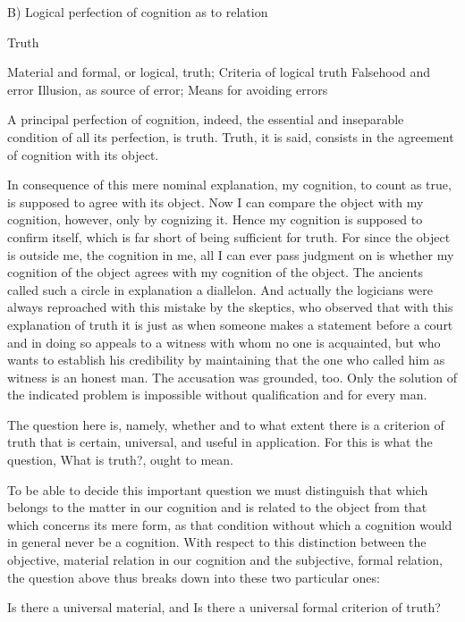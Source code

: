 B) Logical perfection of cognition as to relation

Truth

    Material and formal, or logical, truth;
    Criteria of logical truth
    Falsehood and error
    Illusion, as source of error;
    Means for avoiding errors

A principal perfection of cognition, indeed,
the essential and inseparable condition of all its perfection, is truth.
Truth, it is said, consists in the agreement of cognition with its object.

In consequence of this mere nominal explanation, my cognition,
to count as true, is supposed to agree with its object.
Now I can compare the object with my cognition, however,
only by cognizing it.
Hence my cognition is supposed to confirm itself,
which is far short of being sufficient for truth.
For since the object is outside me, the cognition in me,
all I can ever pass judgment on is whether
my cognition of the object agrees with my cognition of the object.
The ancients called such a circle in explanation a diallelon.
And actually the logicians were always reproached with this mistake by the skeptics, who
observed that with this explanation of truth it is just as when someone
makes a statement before a court and in doing so appeals to a witness with
whom no one is acquainted, but who wants to establish his credibility by
maintaining that the one who called him as witness is an honest man.
The accusation was grounded, too.
Only the solution of the indicated problem
is impossible without qualification and for every man.

The question here is, namely, whether and to what extent there is a
criterion of truth that is certain, universal, and useful in application.
For this is what the question, What is truth?, ought to mean.

To be able to decide this important question we must distinguish that
which belongs to the matter in our cognition and is related to the object
from that which concerns its mere form, as that condition without which a
cognition would in general never be a cognition. With respect to this
distinction between the objective, material relation in our cognition and the
subjective, formal relation, the question above thus breaks down into these
two particular ones:

Is there a universal material, and
Is there a universal formal criterion of truth?


